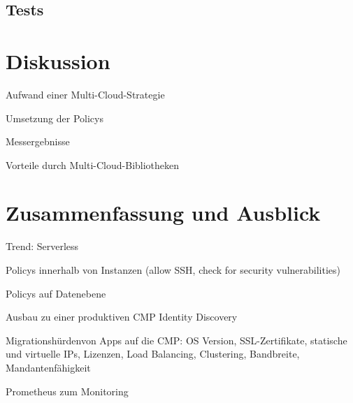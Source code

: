\inputminted[]{yaml}{../services/hyrise.yaml}


\section{Tests}





\chapter{Diskussion}

Aufwand einer Multi-Cloud-Strategie

Umsetzung der Policys

Messergebnisse

Vorteile durch Multi-Cloud-Bibliotheken

\chapter{Zusammenfassung und Ausblick}

Trend: Serverless

Policys innerhalb von Instanzen (allow SSH, check for security vulnerabilities)

Policys auf Datenebene

Ausbau zu einer produktiven CMP
Identity
Discovery


Migrationshürdenvon Apps auf die CMP: OS Version, SSL-Zertifikate, statische und virtuelle IPs, Lizenzen, Load Balancing, Clustering, Bandbreite, Mandantenfähigkeit

Prometheus zum Monitoring